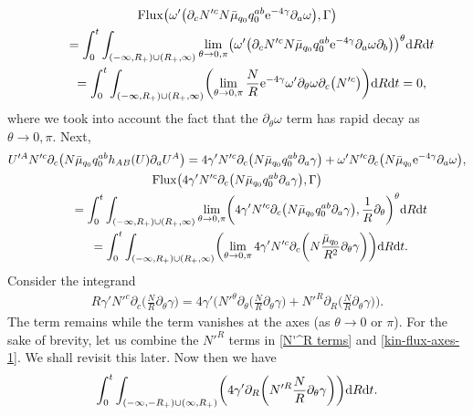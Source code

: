 \documentclass[11pt]{article}
\numberwithin{equation}{section}
\def\ptl{\partial}%
\numberwithin{equation}{section}
\begin{document}
\begin{gather*}
{\rm Flux} \bigl(\omega' \bigl(\ptl_c N'^c N \bar{\mu}_{q_0} q^{ab} _0 {\rm e}^{-4 \gamma} \ptl_a \omega\bigr), \Gamma\bigr) \notag\\
\qquad{}= \int^t_0 \int_{ (-\infty, R_+) \cup (R_+, \infty) } \lim_{\theta \to 0, \pi} \bigl(\omega' \bigl(\ptl_c N'^c N \bar{\mu}_{q_0} q^{ab} _0 {\rm e}^{-4\gamma} \ptl_a \omega \ptl_b\bigr) \bigr)^\theta {\rm d}R {\rm d}t \notag\\
\qquad{}{}= \int^t_0 \int_{ (-\infty, R_+) \cup (R_+, \infty) } \biggl(\lim_{\theta \to 0, \pi} \frac{N}{R} {\rm e}^{-4\gamma} \omega' \ptl_\theta \omega \ptl_c \bigl(N'^c\bigr) \biggr) {\rm d}R {\rm d}t
=0,
\end{gather*}
where we took into account the fact that the $\ptl_\theta \omega$ term has rapid decay as $\theta \to 0, \pi$.
Next,
\begin{gather*}
U'^A N'^c \ptl_c \bigl(N \bar{\mu}_{q_0} q^{ab}_0 h_{AB} (U) \ptl_a U^A\bigr) = 4\gamma' N'^c\ptl_c \bigl(N \bar{\mu}_{q_0} q^{ab}_0 \ptl_a \gamma\bigr)
+ \omega' N'^c \ptl_c \bigl(N \bar{\mu}_{q_0} {\rm e}^{-4\gamma} \ptl_a \omega\bigr),
\\
{\rm Flux} \bigl(4\gamma' N'^c\ptl_c \bigl(N \bar{\mu}_{q_0} q^{ab}_0 \ptl_a \gamma\bigr), \Gamma\bigr) \notag\\
\qquad{}= \int^t_0 \int_{ (-\infty, R_+) \cup (R_+, \infty) } \lim_{\theta \to 0, \pi} \biggl(
 4\gamma' N'^c\ptl_c \bigl(N \bar{\mu}_{q_0} q^{ab}_0 \ptl_a \gamma\bigr), \frac{1}{R} \ptl_\theta \biggr)^\theta {\rm d}R {\rm d}t \\
\qquad{}= \int^t_0 \int_{ (-\infty, R_+) \cup (R_+, \infty) } \biggl(\lim_{\theta \to 0, \pi} 4 \gamma' N'^c \ptl_c \biggl(N\frac{\bar{\mu}_{q_0}}{R^2} \ptl_\theta \gamma\biggr) \biggr) {\rm d}R {\rm d}t.
\end{gather*}
Consider the integrand
\begin{align} \label{N'^R terms}
 R\gamma' N'^c \ptl_c \biggl(\frac{N}{R} \ptl_\theta \gamma\biggr) = 4 \gamma' \biggl(N'^ \theta \ptl_\theta \biggl(\frac{N}{R} \ptl_\theta \gamma\biggr) + N'^R \ptl_R \biggl(\frac{N}{R} \ptl_\theta \gamma\biggr) \biggr).
\end{align}
The  term remains while the  term vanishes at the axes (as $\theta \to 0$ or $\pi$). For the sake of brevity, let us combine the $N'^R$ terms in \eqref{N'^R terms} and \eqref{kin-flux-axes-1}. We shall revisit this later. Now then we have
\begin{align} \label{kin-flux-comb-nu'}
\int^t_0 \int_{ (-\infty,-R_+) \cup (\infty, R_+)} \biggl(4 \gamma' \ptl_R \biggl(N'^R \frac{N}{R} \ptl_\theta \gamma\biggr) \biggr) {\rm d}R {\rm d}t.
\end{align}
\end{document}
